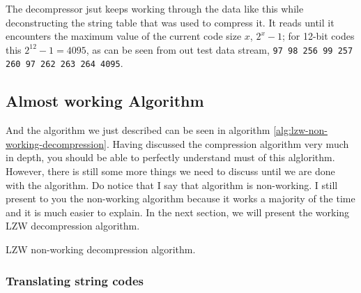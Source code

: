 \begin{refsection}
The decompressor jsut keeps working through the data like this while
deconstructing the string table that was used to compress it. It reads
until it encounters the maximum value of the current code size $x$,
$2^{x}-1$; for 12-bit codes this $2^{12} - 1 = 4095$, as can be seen
from out test data stream, \texttt{97 98 256 99 257 260 97 262 263 264
  4095}.

\subsection{Almost working Algorithm}

And the algorithm we just described can be seen in algorithm
\ref{alg:lzw-non-working-decompression}. Having discussed the
compression algorithm very much in depth, you should be able to
perfectly understand must of this alglorithm. However, there is still
some more things we need to discuss until we are done with the \lzw
algorithm. Do notice that I say that algorithm is non-working. I still
present  to you the non-working algorithm because it works a majority
of the time and it is much easier to explain. In the next section, we
will present the working LZW decompression algorithm.

\begin{algorithm}[H]
  \caption{LZW non-working decompression algorithm.}
  \label{alg:lzw-non-working-decompression}
  \begin{algorithmic}[1]
    \State {}


      \State {}
       

      \State {}


    \EndWhile
  \end{algorithmic}
\end{algorithm}

\subsubsection{Translating string codes}


\end{refsection}

